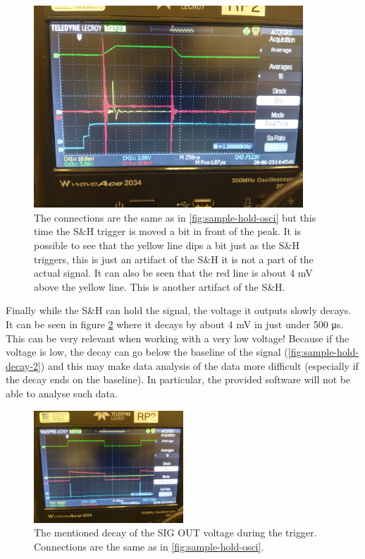 \documentclass[a4paper, 10pt]{article}
\begin{document}
\begin{figure}[H]
    \centering
    \includegraphics[width=0.9\textwidth]{./images/sample-hold-osci-2.jpg}
    \caption{The connections are the same as in \cref{fig:sample-hold-osci} but this time the S\&H trigger is moved a bit in front of the peak. It is possible to see that the yellow line dips a bit just as the S\&H triggers, this is just an artifact of the S\&H it is not a part of the actual signal. It can also be seen that the red line is about 4 \si{\milli\volt} above the yellow line. This is another artifact of the S\&H.}
    \label{fig:sample-hold-osci-2}
\end{figure}

Finally while the S\&H can hold the signal, the voltage it outputs slowly decays.
It can be seen in figure \cref{fig:sample-hold-decay} where it decays by about 4 \si{\milli\volt} in just under 500 \si{\micro\second}.
This can be very relevant when working with a very low voltage!
Because if the voltage is low, the decay can go below the baseline of the signal (\cref{fig:sample-hold-decay-2}) and this may make data analysis of the data more difficult (especially if the decay ends on the baseline).
In particular, the provided software will not be able to analyse such data.

\begin{figure}[H]
    \centering
    \includegraphics[width=0.5\textwidth]{./images/sample-hold-decay.jpg}
    \caption{The mentioned decay of the SIG OUT voltage during the trigger. Connections are the same as in \cref{fig:sample-hold-osci}.}
    \label{fig:sample-hold-decay}
\end{figure}
\end{document}
